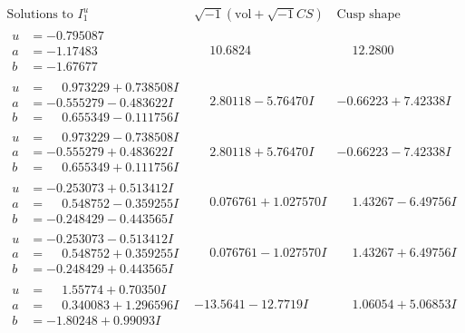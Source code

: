 \documentclass[1p]{elsarticle_modified}
\theoremstyle{definition}
\newcommand{\I}{\sqrt{-1}}
\begin{document}
$$\begin{array}{c|c|c}  
\text{Solutions to }I^u_{1}& \I (\text{vol} + \sqrt{-1}CS) & \text{Cusp shape}\\
 \hline 
\begin{aligned}
u &= -0.795087\phantom{ +0.000000I} \\
a &= -1.17483\phantom{ +0.000000I} \\
b &= -1.67677\phantom{ +0.000000I}\end{aligned}
 & \phantom{-}10.6824\phantom{ +0.000000I} & \phantom{-}12.2800\phantom{ +0.000000I} \\ \hline\begin{aligned}
u &= \phantom{-}0.973229 + 0.738508 I \\
a &= -0.555279 - 0.483622 I \\
b &= \phantom{-}0.655349 - 0.111756 I\end{aligned}
 & \phantom{-}2.80118 - 5.76470 I & -0.66223 + 7.42338 I \\ \hline\begin{aligned}
u &= \phantom{-}0.973229 - 0.738508 I \\
a &= -0.555279 + 0.483622 I \\
b &= \phantom{-}0.655349 + 0.111756 I\end{aligned}
 & \phantom{-}2.80118 + 5.76470 I & -0.66223 - 7.42338 I \\ \hline\begin{aligned}
u &= -0.253073 + 0.513412 I \\
a &= \phantom{-}0.548752 - 0.359255 I \\
b &= -0.248429 - 0.443565 I\end{aligned}
 & \phantom{-}0.076761 + 1.027570 I & \phantom{-}1.43267 - 6.49756 I \\ \hline\begin{aligned}
u &= -0.253073 - 0.513412 I \\
a &= \phantom{-}0.548752 + 0.359255 I \\
b &= -0.248429 + 0.443565 I\end{aligned}
 & \phantom{-}0.076761 - 1.027570 I & \phantom{-}1.43267 + 6.49756 I \\ \hline\begin{aligned}
u &= \phantom{-}1.55774 + 0.70350 I \\
a &= \phantom{-}0.340083 + 1.296596 I \\
b &= -1.80248 + 0.99093 I\end{aligned}
 & -13.5641 - 12.7719 I & \phantom{-}1.06054 + 5.06853 I \\ \hline\begin{aligned}

\end{aligned}
\end{array}$$
\end{document}
